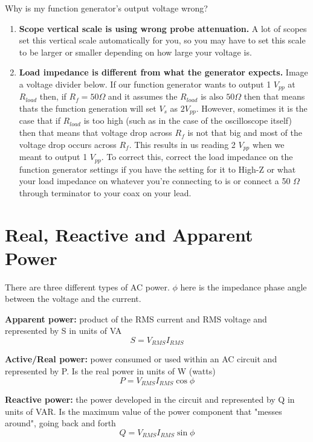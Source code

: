 Why is my function generator's output voltage wrong?
\begin{enumerate}
    \item \textbf{Scope vertical scale is using wrong probe attenuation.} A lot of scopes set this vertical scale automatically for you, so you may have to set this scale to be larger or smaller depending on how large your voltage is.
    \item \textbf{Load impedance is different from what the generator expects.} Image a voltage divider below. If our function generator wants to output 1 $V_{pp}$ at $R_{load}$ then, if $R_f = 50 \Omega$ and it assumes the $R_{load}$ is also $50 \Omega$ then that means thats the function generation will set $V_s$ as $2 V_{pp}$. 
    However, sometimes it is the case that if $R_{load}$ is too high (such as in the case of the oscilloscope itself) then that means that voltage drop across $R_f$ is not that big and most of the voltage drop occurs across $R_f$. 
    This results in us reading 2 $V_{pp}$ when we meant to output 1 $V_{pp}$. To correct this, correct the load impedance on the function generator settings if you have the setting for it to High-Z or what your load impedance on whatever you're connecting to is or connect a 50 $\Omega$ through terminator to your coax on your lead.
    
    
\end{enumerate}

\section{Real, Reactive and Apparent Power}
There are three different types of AC power. $\phi$ here is the impedance phase angle between the voltage and the current.
\begin{pline}
    \item \textbf{Apparent power:} product of the RMS current and RMS voltage and represented by S in units of VA
        \[S = V_{RMS} I_{RMS}\]
    \item \textbf{Active/Real power:} power consumed or used within an AC circuit and represented by P. Is the real power in units of W (watts)
        \[P = V_{RMS} I_{RMS} \cos{\phi}\]
    \item \textbf{Reactive power:} the power developed in the circuit and represented by Q in units of VAR. Is the maximum value of the power component that "messes around", going back and forth
        \[Q = V_{RMS} I_{RMS} \sin{\phi}\]
\end{pline}

